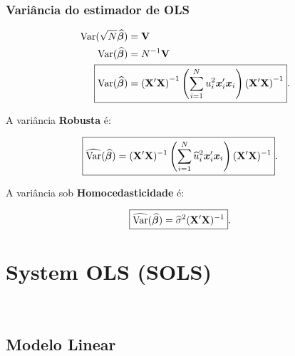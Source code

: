 \documentclass[11pt, oneside, a4paper, article]{article}
\numberwithin{equation}{section}
\begin{document}
\subsubsection{Variância do estimador de OLS }

\vspace{-1 em}
\begin{align*}
\Var(\sqrt{N} \betahatbold) &= \Vmat
\\
\Var(\betahatbold) &= N^{-1} \Vmat
\\
\Aboxed{
\Var(\betahatbold) &= 
\left( \Xmat'\Xmat \right)^{-1}
\left( \sum_{i=1}^{N} u_{i}^2 \mbs{x}_{i}' \mbs{x}_{i} \right)
\left( \Xmat'\Xmat \right)^{-1} }.
\end{align*}

\noindent
A variância \textbf{Robusta} é:

\vspace{-1 em}
\begin{align*}
\Aboxed{
\widehat{\Var}(\betahatbold) &= 
(\Xmat'\Xmat)^{-1} 
\left( \sum_{i=1}^{N} \widehat{u}_{i}^{2} \mbs{x}_{i}' \mbs{x}_{i} \right)
(\Xmat'\Xmat)^{-1} }.
\end{align*}

\noindent
A variância sob \textbf{Homocedasticidade} é:

\vspace{-1 em}
\begin{align*}
	\Aboxed{\widehat{\Var}(\betahatbold) &= \widehat{\sigma}^{2} (\Xmat' \Xmat)^{-1}} .
\end{align*}

\clearpage
\section{System OLS (SOLS)}

\noindent
\citet[C.7 -- Estimating Systems of Equations by OLS and GLS, p.143--179]{wool-2010}\\
\citet[Sec.7.3 -- System OLS Estimation of a Multivariate Linear System, p.147]{wool-2010} 

\subsection{Modelo Linear}
\end{document}
